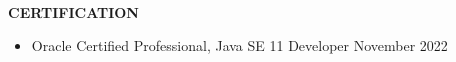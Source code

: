 \begin{flushleft}
    \hrulefill \\
    \begin{large}
        \begin{center}\textbf{CERTIFICATION}\end{center} 
    \end{large} 
\end{flushleft}
\begin{itemize}
	\item Oracle Certified Professional, Java SE 11 Developer \hfill November 2022
\end{itemize}